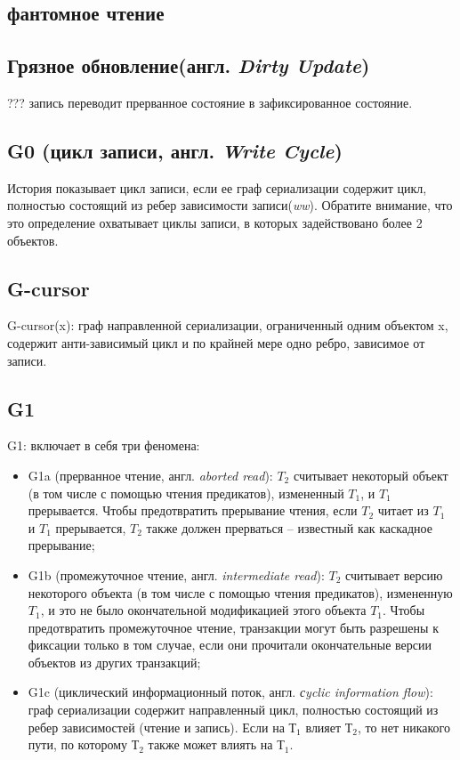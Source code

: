 \documentclass[12pt,  openany]{book}
\begin{document}
\subsection{фантомное чтение}
\subsection{Грязное обновление(англ. \textit{Dirty Update})}
???
запись переводит прерванное состояние в зафиксированное состояние.

\subsection{G0 (цикл записи, англ. \textit{Write Cycle})}
История показывает цикл записи, если ее граф  сериализации содержит цикл, полностью состоящий из ребер зависимости записи(\textit{ww}). Обратите внимание, что это определение охватывает циклы записи, в которых задействовано более 2 объектов.

\subsection{G-cursor}
G-cursor(x): граф направленной сериализации, ограниченный одним объектом x, содержит анти-зависимый цикл и по крайней мере одно ребро, зависимое от записи.

\subsection{G1}
G1: включает в себя три феномена: 
\begin{itemize}
\item G1a (прерванное чтение, англ. \textit{aborted read}): $T_2$ считывает некоторый объект (в том числе с помощью чтения предикатов), измененный $T_1$, и $T_1$ прерывается. Чтобы предотвратить прерывание чтения, если $T_2$ читает из $T_1$ и $T_1$ прерывается, $T_2$ также должен прерваться – известный как каскадное прерывание;
\item G1b (промежуточное чтение, англ. \textit{intermediate read}): $T_2$ считывает версию некоторого объекта (в том числе с помощью чтения предикатов), измененную $T_1$, и это не было окончательной модификацией этого объекта $T_1$. Чтобы предотвратить промежуточное чтение, транзакции могут быть разрешены к фиксации только в том случае, если они прочитали окончательные версии объектов из других транзакций;
\item G1c (циклический информационный поток, англ. \textit{сyclic information flow}): граф сериализации содержит направленный цикл, полностью состоящий из ребер зависимостей (чтение и запись). Если на $Т_1$ влияет $Т_2$, то нет никакого пути, по которому $Т_2$ также может влиять на $Т_1$.
\end{itemize}
\end{document}
